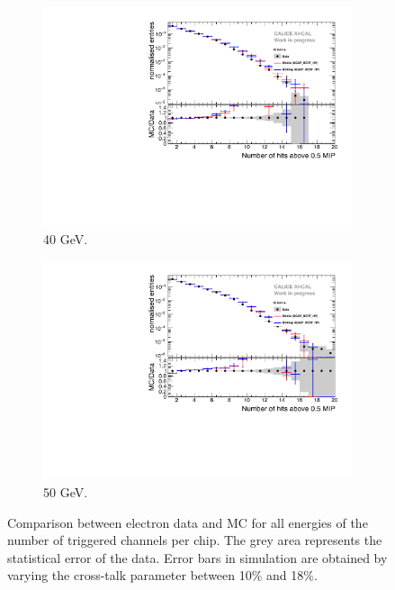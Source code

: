 \begin{figure}[htbp!]
\begin{subfigure}[t]{0.45\textwidth}
		\includegraphics[width=1\textwidth]{chap5/fig_AHCAL_timing/Electrons/Comparison_SimData_Electrons_nHits_40GeV.pdf}
		\caption{40 GeV.}\label{fig:elec_sim_data_nHits_40GeV}
	\end{subfigure}
	\hfill
	\begin{subfigure}[t]{0.45\textwidth}
		\centering
		\includegraphics[width=1\textwidth]{chap5/fig_AHCAL_timing/Electrons/Comparison_SimData_Electrons_nHits_50GeV.pdf}
		\caption{50 GeV.}\label{fig:elec_sim_data_nHits_50GeV}
	\end{subfigure}
	\caption{Comparison between electron data and MC for all energies of the number of triggered channels per chip. The grey area represents the statistical error of the data. Error bars in simulation are obtained by varying the cross-talk parameter between 10\% and 18\%.}
	\label{fig:sim_data_elec_nHits}
\end{figure}

